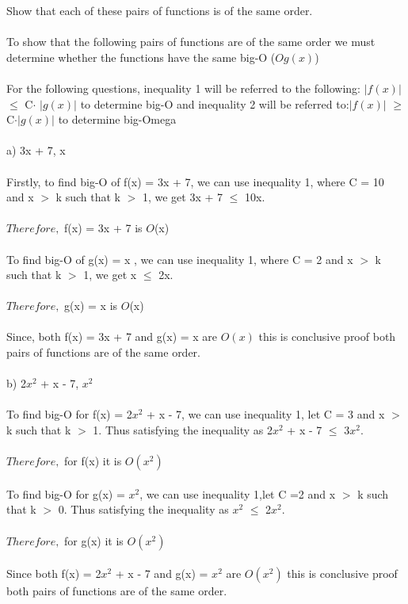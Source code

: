 \documentclass{article}
\begin{document}
Show that each of these pairs of functions is of the same order. \\ \\
To show that the following pairs of functions are of the same order we must determine whether the functions have the same big-O ($Og(x)$) \\\\
For the following questions, inequality 1 will be referred to the following: $\left| f(x) \right|$$\leq$ C$\cdot$ $\left| g(x) \right|$ to determine big-O and inequality 2 will be referred to:$\left| f(x) \right|$ $\geq$ C$\cdot$$\left| g(x) \right|$ to determine big-Omega \\ \\
a) 3x + 7, x \\\\
Firstly, to find big-O of f(x) = 3x + 7, we can use inequality 1, where C = 10 and x $>$ k such that k $>$ 1, we get 3x + 7 $\leq$ 10x. \\\\
$Therefore,$ f(x) = 3x + 7 is $O$(x) \\\\
To find big-O of g(x) = x , we can use inequality 1, where C = 2 and x $>$ k such that k $>$ 1, we get x $\leq$ 2x. \\\\
$Therefore,$ g(x) = x  is $O$(x) \\\\
Since, both f(x) = 3x + 7 and g(x) = x are  $O(x)$ this is conclusive proof both pairs of functions are of the same order. \\\\
b) 2$x^2$ + x - 7, $x^2$ \\ \\
To find big-O for f(x) =  2$x^2$ + x - 7, we can use inequality 1, let C = 3 and x $>$ k such that k $>$ 1. Thus satisfying the inequality as 2$x^2$ + x - 7 $\leq$ 3$x^2$. \\ \\ $Therefore,$ for f(x) it is $O(x^2)$ \\ \\  
To find big-O for g(x) = $x^2$, we can use inequality 1,let C =2 and  x $>$ k such that k $>$ 0. Thus satisfying the inequality as $x^2$ $\leq$ 2$x^2$. \\\\ $Therefore,$ for g(x) it is $O(x^2)$ \\ \\ 
Since both f(x) = 2$x^2$ + x - 7 and g(x) = $x^2$ are  $O(x^2)$ this is conclusive proof both pairs of functions are of the same order. \\\\
\end{document}
